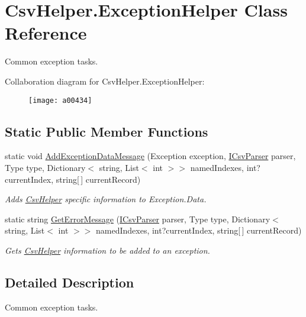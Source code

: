 \hypertarget{a00092}{\section{Csv\-Helper.\-Exception\-Helper Class Reference}
\label{a00092}
}


Common exception tasks.  




Collaboration diagram for Csv\-Helper.\-Exception\-Helper\-:
\nopagebreak
\begin{figure}[H]
\begin{center}
\leavevmode
\texttt{[image: a00434]}
\end{center}
\end{figure}
\subsection*{Static Public Member Functions}
\begin{DoxyCompactItemize}
\item 
static void \hyperlink{a00092_a7415ea84b6d462b9d61ecf2128282837}{Add\-Exception\-Data\-Message} (Exception exception, \hyperlink{a00103}{I\-Csv\-Parser} parser, Type type, Dictionary$<$ string, List$<$ int $>$$>$ named\-Indexes, int?current\-Index, string\mbox{[}$\,$\mbox{]} current\-Record)
\begin{DoxyCompactList}\small\item\em Adds \hyperlink{a00319}{Csv\-Helper} specific information to Exception.\-Data. \end{DoxyCompactList}\item 
static string \hyperlink{a00092_a11e421dc9f9fdb2b72d060a24471b5be}{Get\-Error\-Message} (\hyperlink{a00103}{I\-Csv\-Parser} parser, Type type, Dictionary$<$ string, List$<$ int $>$$>$ named\-Indexes, int?current\-Index, string\mbox{[}$\,$\mbox{]} current\-Record)
\begin{DoxyCompactList}\small\item\em Gets \hyperlink{a00319}{Csv\-Helper} information to be added to an exception. \end{DoxyCompactList}\end{DoxyCompactItemize}


\subsection{Detailed Description}
Common exception tasks. 



